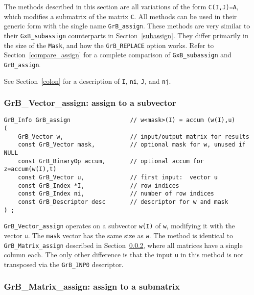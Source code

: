 \documentclass[12pt]{article}
\begin{document}
The methods described in this section are all variations of the form
\verb'C(I,J)=A', which modifies a submatrix of the matrix \verb'C'.  All
methods can be used in their generic form with the single name
\verb'GrB_assign'.  These methods are very similar to their
\verb'GxB_subassign' counterparts in Section~\ref{subassign}.  They differ
primarily in the size of the \verb'Mask', and how the \verb'GrB_REPLACE' option
works.  Refer to Section~\ref{compare_assign} for a complete comparison of
\verb'GxB_subassign' and \verb'GrB_assign'.

See Section~\ref{colon} for a description of
\verb'I', \verb'ni', \verb'J', and \verb'nj'.

\subsubsection{{\sf GrB\_Vector\_assign:} assign to a subvector }
\label{assign_vector}

\begin{mdframed}[userdefinedwidth=6in]
{\footnotesize
\begin{verbatim}
GrB_Info GrB_assign                 // w<mask>(I) = accum (w(I),u)
(
    GrB_Vector w,                   // input/output matrix for results
    const GrB_Vector mask,          // optional mask for w, unused if NULL
    const GrB_BinaryOp accum,       // optional accum for z=accum(w(I),t)
    const GrB_Vector u,             // first input:  vector u
    const GrB_Index *I,             // row indices
    const GrB_Index ni,             // number of row indices
    const GrB_Descriptor desc       // descriptor for w and mask
) ;
\end{verbatim} } \end{mdframed}

\verb'GrB_Vector_assign' operates on a subvector \verb'w(I)' of \verb'w',
modifying it with the vector \verb'u'.  The \verb'mask' vector has the same
size as \verb'w'.  The method is identical to \verb'GrB_Matrix_assign'
described in Section~\ref{assign_matrix}, where all matrices have a single
column each.  The only other difference is that the input \verb'u' in this
method is not transposed via the \verb'GrB_INP0' descriptor.

\newpage
\subsubsection{{\sf GrB\_Matrix\_assign:} assign to a submatrix }
\label{assign_matrix}
\end{document}
